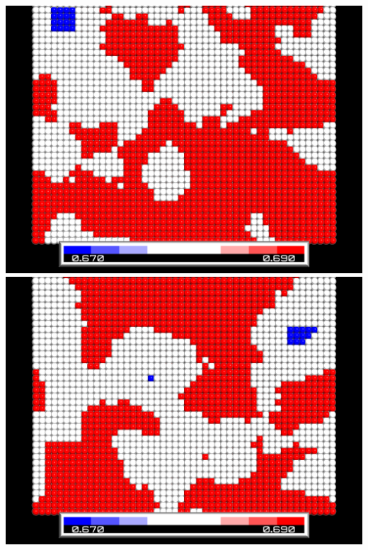 % 


\begin{center}
\includegraphics[scale=0.01]{Plots/glomepro/snap_MEM-DMPG_1_do.png}
\includegraphics[scale=0.01]{Plots/glomepro/snap_MEM-DMPG_1_up.png}

\end{center}
